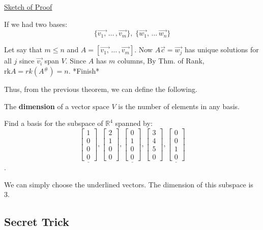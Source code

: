 \documentclass[../main.tex]{subfiles}
\begin{document}
\underline{Sketch of Proof}

If we had two bases:
\[ \{ \vec{v_1,} \, \dots \, , \vec{v_m}\}, \; \{\vec{w_1}, \, \dots \, \vec{w_n}\} \]

Let say that \( m \leq n\) and \( A = [ \vec{v_1,} \, \dots \, , \vec{v_m} ] \).
Now \( A \vec{c} = \vec{w_j} \) has unique solutions for all \( j \) since \( \vec{v_i} \) span \( V \).
Since \( A \) has \( m \) columns, 
By Thm. of Rank, \( \text{rk}A = rk(A^\#) = n \).
*Finish*

Thus, from the previous theorem, we can define the following.

\begin{definition}[Dimension]
    The \textbf{dimension} of a vector space \( V \) is the number of elements in any basis.
\end{definition}

\begin{example}[]
    Find a basis for the subspace of \( \mathbb{R}^4 \) spanned by:
    \[
        \underline{\begin{bmatrix} 1 \\ 0 \\ 0 \\ 0 \end{bmatrix}},
        \begin{bmatrix} 2 \\ 1 \\ 0 \\ 0 \end{bmatrix},
        \underline{\begin{bmatrix} 0 \\ 1 \\ 0 \\ 0 \end{bmatrix}},
        \begin{bmatrix} 3 \\ 4 \\ 5 \\ 0 \end{bmatrix},
        \underline{\begin{bmatrix} 0 \\ 0 \\ 1 \\ 0 \end{bmatrix}}
    \].

    We can simply choose the underlined vectors. The dimension of this subspace is 3.
\end{example}

\subsection{Secret Trick}
\end{document}
